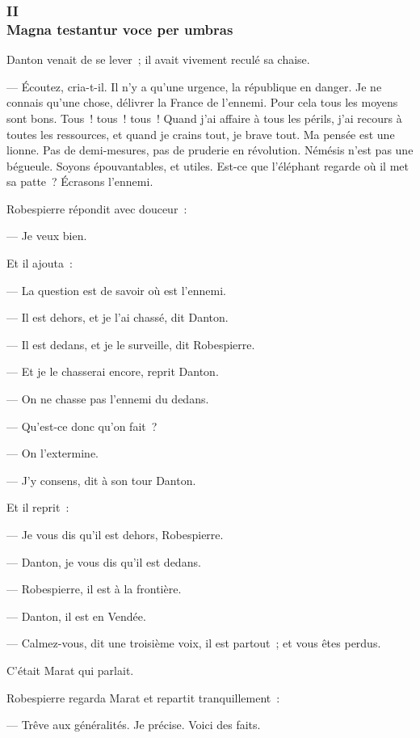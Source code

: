 \documentclass[french,twoside]{book} %
\begin{document}
 \subsubsection[{II. Magna testantur voce per umbras}]{II \\
Magna testantur voce per umbras}
\label{p2l2c2}
\noindent Danton venait de se lever ; il avait vivement reculé sa chaise.\par
— Écoutez, cria-t-il. Il n’y a qu’une urgence, la république en danger. Je ne connais qu’une chose, délivrer la France de l’ennemi. Pour cela tous les moyens sont bons. Tous ! tous ! tous ! Quand j’ai affaire à tous les périls, j’ai recours à toutes les ressources, et quand je crains tout, je brave tout. Ma pensée est une lionne. Pas de demi-mesures, pas de pruderie en révolution. Némésis n’est pas une bégueule. Soyons épouvantables, et utiles. Est-ce que l’éléphant regarde où il met sa patte ? Écrasons l’ennemi.\par
Robespierre répondit avec douceur :\par
— Je veux bien.\par
Et il ajouta :\par
— La question est de savoir où est l’ennemi.\par
— Il est dehors, et je l’ai chassé, dit Danton.\par
— Il est dedans, et je le surveille, dit Robespierre.\par
— Et je le chasserai encore, reprit Danton.\par
— On ne chasse pas l’ennemi du dedans.\par
— Qu’est-ce donc qu’on fait ?\par
 — On l’extermine.\par
— J’y consens, dit à son tour Danton.\par
Et il reprit :\par
— Je vous dis qu’il est dehors, Robespierre.\par
— Danton, je vous dis qu’il est dedans.\par
— Robespierre, il est à la frontière.\par
— Danton, il est en Vendée.\par
— Calmez-vous, dit une troisième voix, il est partout ; et vous êtes perdus.\par
C’était Marat qui parlait.\par
Robespierre regarda Marat et repartit tranquillement :\par
— Trêve aux généralités. Je précise. Voici des faits.\par
\end{document}
